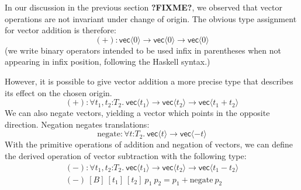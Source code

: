 In our discussion in the previous section \textbf{?FIXME?}, we
observed that vector operations are not invariant under change of
origin. The obvious type assignment for vector addition is therefore:
\begin{displaymath}
  (+) : \mathsf{vec}\langle 0 \rangle \to \mathsf{vec}\langle 0 \rangle \to \mathsf{vec}\langle 0 \rangle
\end{displaymath}
(we write binary operators intended to be used infix in parentheses
when not appearing in infix position, following the Haskell
syntax.)

However, it is possible to give vector addition a more precise type
that describes its effect on the chosen origin. 
%
\begin{displaymath}
  (+) : \forall t_1, t_2 \mathord: T_2.\ \mathsf{vec}\langle t_1\rangle \to \mathsf{vec}\langle t_2 \rangle \to \mathsf{vec}\langle t_1 + t_2 \rangle
\end{displaymath}
We can also negate vectors, yielding a vector which points in the
opposite direction. Negation negates translations:
\begin{displaymath}
  \mathrm{negate} : \forall t \mathord: T_2.\ \mathsf{vec}\langle t \rangle \to \mathsf{vec}\langle -t \rangle
\end{displaymath}
With the primitive operations of addition and negation of vectors, we can define the derived
operation of vector subtraction with the following type:
\begin{displaymath}
  \begin{array}{l}
    (-) : \forall t_1,t_2 \mathord:T_2.\ \mathsf{vec}\langle t_1\rangle \to \mathsf{vec}\langle t_2\rangle \to \mathsf{vec}\langle t_1 - t_2 \rangle \\
    (-)\ [B]\ [t_1]\ [t_2]\ p_1\ p_2 = p_1 + \mathrm{negate}\ p_2
  \end{array}
\end{displaymath}

